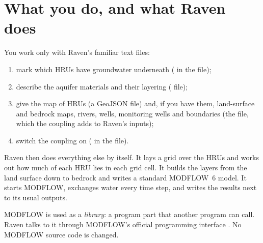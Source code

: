 \section{What you do, and what Raven does}
You work only with Raven's familiar text files:
\begin{enumerate}
\item mark which HRUs have groundwater underneath ( in the  file);
\item describe the aquifer materials and their layering ( file);
\item give the map of HRUs (a GeoJSON file) and, if you have them, land-surface and bedrock maps, rivers, wells,
monitoring wells and boundaries (the  file, which the coupling adds to Raven's inputs);
\item switch the coupling on ( in the  file).
\end{enumerate}
Raven then does everything else by itself. It lays a grid over the HRUs and works out how much of each HRU lies in each
grid cell. It builds the layers from the land surface down to bedrock and writes a standard MODFLOW~6 model. It starts
MODFLOW, exchanges water every time step, and writes the results next to its usual outputs.

MODFLOW is used as a \emph{library}: a program part that another program can call. Raven talks to it through MODFLOW's
official programming interface \cite{hughes2022xmi}. No MODFLOW source code is changed.

